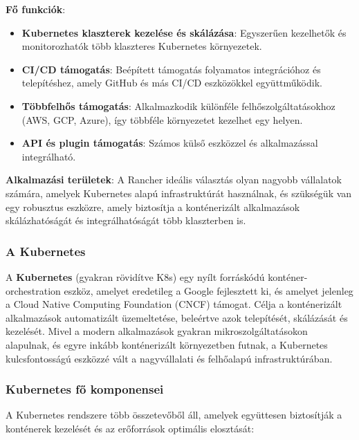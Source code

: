 \textbf{Fő funkciók}:
\begin{itemize}
	\item \textbf{Kubernetes klaszterek kezelése és skálázása}: Egyszerűen kezelhetők és monitorozhatók több klaszteres Kubernetes környezetek.
	\item \textbf{CI/CD támogatás}: Beépített támogatás folyamatos integrációhoz és telepítéshez, amely GitHub és más CI/CD eszközökkel együttműködik.
	\item \textbf{Többfelhős támogatás}: Alkalmazkodik különféle felhőszolgáltatásokhoz (AWS, GCP, Azure), így többféle környezetet kezelhet egy helyen.
	\item \textbf{API és plugin támogatás}: Számos külső eszközzel és alkalmazással integrálható.
\end{itemize}

\textbf{Alkalmazási területek}:
A Rancher ideális választás olyan nagyobb vállalatok számára, amelyek Kubernetes alapú infrastruktúrát használnak, és szükségük van egy robusztus eszközre, amely biztosítja a konténerizált alkalmazások skálázhatóságát és integrálhatóságát több klaszterben is.

\subsubsection{A Kubernetes}

A \textbf{Kubernetes} (gyakran rövidítve K8s) egy nyílt forráskódú konténer-orchestration eszköz, amelyet eredetileg a Google fejlesztett ki, és amelyet jelenleg a Cloud Native Computing Foundation (CNCF) támogat. Célja a konténerizált alkalmazások automatizált üzemeltetése, beleértve azok telepítését, skálázását és kezelését. Mivel a modern alkalmazások gyakran mikroszolgáltatásokon alapulnak, és egyre inkább konténerizált környezetben futnak, a Kubernetes kulcsfontosságú eszközzé vált a nagyvállalati és felhőalapú infrastruktúrában.

\subsubsection{Kubernetes fő komponensei}

A Kubernetes rendszere több összetevőből áll, amelyek együttesen biztosítják a konténerek kezelését és az erőforrások optimális elosztását:

